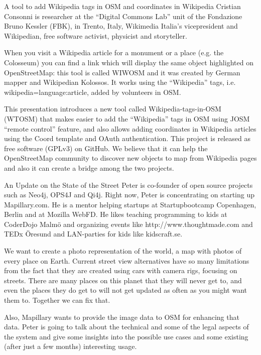 %
{A tool to add Wikipedia tags in OSM and coordinates in Wikipedia}%
{Cristian Consonni is researcher at the ``Digital Commons Lab'' unit of the Fondazione Bruno Kessler (FBK), in Trento, Italy, Wikimedia Italia's vicepresident and Wikipedian, free software activist, physicist and storyteller.}%
{When you visit a Wikipedia article for a monument or a place (e.g. the Colosseum) you can find a link which will display the same object highlighted on OpenStreetMap: this tool is called WIWOSM and it was created by German mapper and Wikipedian Kolossos. It works using the ``Wikipedia'' tags, i.e. wikipedia=language:article, added by volunteers in OSM.

This presentation introduces a new tool called Wikipedia-tags-in-OSM (WTOSM) that makes easier to add the ``Wikipedia'' tags in OSM using JOSM ``remote control'' feature, and also allows adding coordinates in Wikipedia articles using the {{Coord}} template and OAuth authentication. This project is released as free software (GPLv3) on GitHub. We believe that it can help the OpenStreetMap community to discover new objects to map from Wikipedia pages and also it can create a bridge among the two projects.}

%
{An Update on the State of the Street}%
{Peter is co-founder of open source projects such as Neo4j, OPS4J and Qi4j. Right now, Peter is concentrating on starting up Mapillary.com. He is a mentor helping startups at Startupbootcamp Copenhagen, Berlin and at Mozilla WebFD. He likes teaching programming to kids at CoderDojo Malmö and organizing events like http://www.thoughtmade.com and TEDx Öresund and LAN-parties for kids like kidscraft.se.}%
{We want to create a photo representation of the world, a map with photos of every place on Earth. Current street view alternatives have so many limitations from the fact that they are created using cars with camera rigs, focusing on streets. There are many places on this planet that they will never get to, and even the places they do get to will not get updated as often as you might want them to. Together we can fix that. 

Also, Mapillary wants to provide the image data to OSM for enhancing that data. 
Peter is going to talk about the technical and some of the legal aspects of the system and give some insights into the possible use cases and some existing (after just a few months) interesting usage.}

